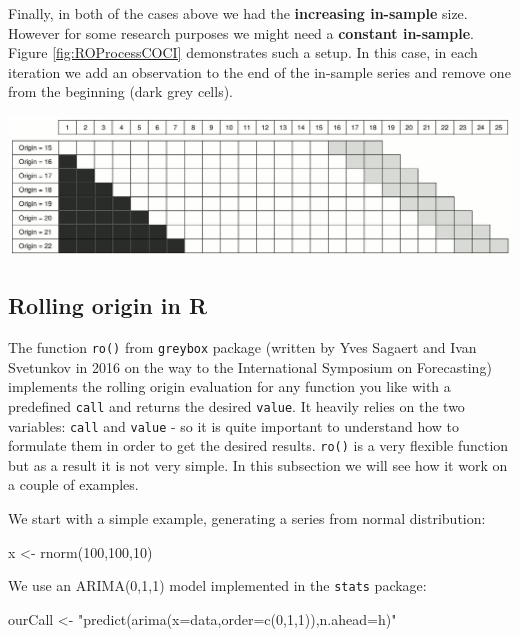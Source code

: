 \documentclass[
]{book}
\newenvironment{Shaded}{\begin{snugshade}}{\end{snugshade}}
\newcommand{\DecValTok}[1]{\textcolor[rgb]{0.00,0.00,0.81}{#1}}
\newcommand{\FunctionTok}[1]{\textcolor[rgb]{0.00,0.00,0.00}{#1}}
\newcommand{\NormalTok}[1]{#1}
\newcommand{\OtherTok}[1]{\textcolor[rgb]{0.56,0.35,0.01}{#1}}
\newcommand{\StringTok}[1]{\textcolor[rgb]{0.31,0.60,0.02}{#1}}
\theoremstyle{definition}
\theoremstyle{definition}
\theoremstyle{definition}
\theoremstyle{definition}
\theoremstyle{remark}
\begin{document}
Finally, in both of the cases above we had the \textbf{increasing in-sample} size. However for some research purposes we might need a \textbf{constant in-sample}. Figure \ref{fig:ROProcessCOCI} demonstrates such a setup. In this case, in each iteration we add an observation to the end of the in-sample series and remove one from the beginning (dark grey cells).

\includegraphics{./images/03-ROProcessCOCI.jpg}

\hypertarget{rolling-origin-in-r}{%
\subsection{Rolling origin in R}\label{rolling-origin-in-r}}

The function \texttt{ro()} from \texttt{greybox} package (written by Yves Sagaert and Ivan Svetunkov in 2016 on the way to the International Symposium on Forecasting) implements the rolling origin evaluation for any function you like with a predefined \texttt{call} and returns the desired \texttt{value}. It heavily relies on the two variables: \texttt{call} and \texttt{value} - so it is quite important to understand how to formulate them in order to get the desired results. \texttt{ro()} is a very flexible function but as a result it is not very simple. In this subsection we will see how it work on a couple of examples.

We start with a simple example, generating a series from normal distribution:

\begin{Shaded}
\begin{Highlighting}[]
\NormalTok{x }\OtherTok{\textless{}{-}} \FunctionTok{rnorm}\NormalTok{(}\DecValTok{100}\NormalTok{,}\DecValTok{100}\NormalTok{,}\DecValTok{10}\NormalTok{)}
\end{Highlighting}
\end{Shaded}

We use an ARIMA(0,1,1) model implemented in the \texttt{stats} package:

\begin{Shaded}
\begin{Highlighting}[]
\NormalTok{ourCall }\OtherTok{\textless{}{-}} \StringTok{"predict(arima(x=data,order=c(0,1,1)),n.ahead=h)"}
\end{Highlighting}
\end{Shaded}
\end{document}
